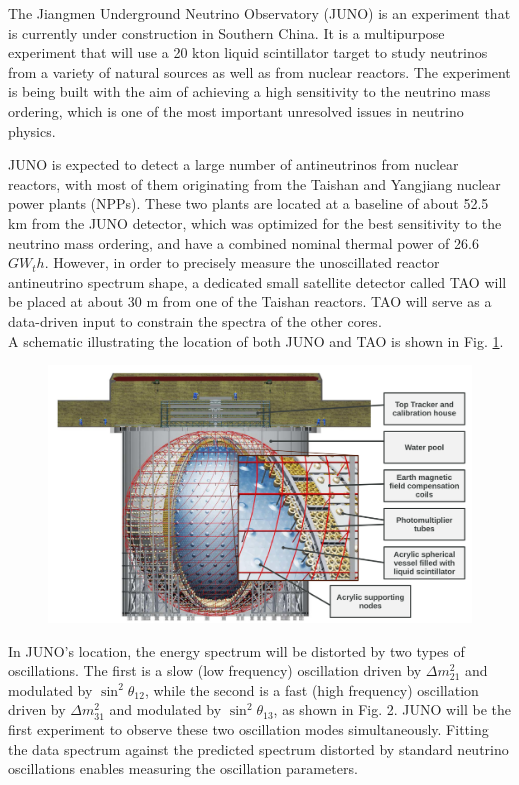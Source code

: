 The Jiangmen Underground Neutrino Observatory (JUNO) is an experiment that is currently under construction in Southern China. It is a multipurpose experiment that will use a 20 kton liquid scintillator target to study neutrinos from a variety of natural sources as well as from nuclear reactors. The experiment is being built with the aim of achieving a high sensitivity to the neutrino mass ordering, which is one of the most important unresolved issues in neutrino physics.

JUNO is expected to detect a large number of antineutrinos from nuclear reactors, with most of them originating from the Taishan and Yangjiang nuclear power plants (NPPs). These two plants are located at a baseline of about 52.5 km from the JUNO detector, which was optimized for the best sensitivity to the neutrino mass ordering, and have a combined nominal thermal power of 26.6 $GW_th$. However, in order to precisely measure the unoscillated reactor antineutrino spectrum shape, a dedicated small satellite detector called TAO will be placed at about 30 m from one of the Taishan reactors. TAO will serve as a data-driven input to constrain the spectra of the other cores.\\
A schematic illustrating the location of both JUNO and TAO is shown in Fig. \ref{fig:junoschemeexperiment}.

\begin{figure}
	\centering
	\includegraphics[width=0.6\linewidth]{Images/juno_cheme_experiment}
	\caption[Juno experiment scheme]{}
	\label{fig:junoschemeexperiment}
\end{figure}


In JUNO's location, the energy spectrum will be distorted by two types of oscillations. The first is a slow (low frequency) oscillation driven by $\Delta m_{21}^2$ and modulated by $\sin ^2 \theta_{12}$, while the second is a fast (high frequency) oscillation driven by $\Delta m_{31}^2$ and modulated by $\sin ^2 \theta_{13}$, as shown in Fig. 2. JUNO will be the first experiment to observe these two oscillation modes simultaneously. Fitting the data spectrum against the predicted spectrum distorted by standard neutrino oscillations enables measuring the oscillation parameters.

